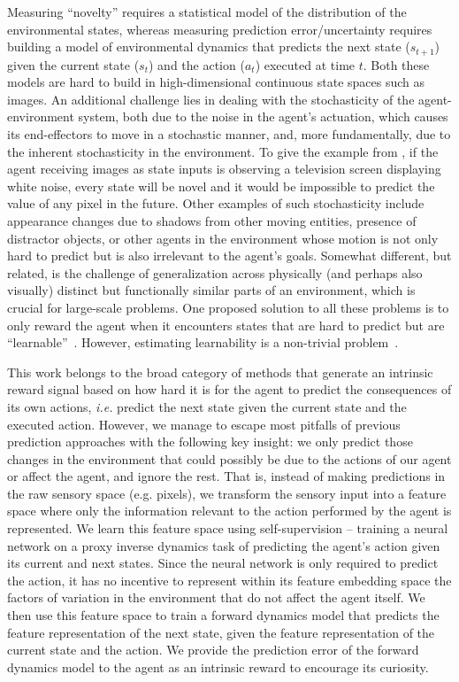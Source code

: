 \documentclass{article}
\begin{document}
Measuring ``novelty'' requires a statistical model of the distribution of the environmental states, whereas measuring prediction error/uncertainty requires building a model of environmental dynamics that predicts the next state ($s_{t+1}$) given the current state ($s_{t}$) and the action ($a_{t}$) executed at time $t$. Both these models are hard to build in high-dimensional continuous state spaces such as images. An additional challenge lies in dealing with the stochasticity of the agent-environment system, both due to the noise in the agent's actuation, which causes its end-effectors to move in a stochastic manner, and, more fundamentally, due to the inherent stochasticity in the environment. To give the example from \cite{schmidhuber2010formal}, if the agent receiving images as state inputs is observing a television screen displaying white noise, every state will be novel and it would be impossible to predict the value of any pixel in the future. Other examples of such stochasticity include appearance changes due to shadows from other moving entities, presence of distractor objects, or other agents in the environment whose motion is not only hard to predict but is also irrelevant to the agent's goals. Somewhat different, but related, is the challenge of generalization across physically (and perhaps also visually) distinct but functionally similar parts of an environment, which is crucial for large-scale problems.
One proposed solution to all these problems is to only reward the agent when it encounters states that are hard to predict but are ``learnable''~\cite{schmidhuber1991possibility}. However, estimating learnability is a non-trivial problem~\cite{lopes2012exploration}.

This work belongs to the broad category of methods that generate an intrinsic reward signal based on how hard it is for the agent to predict the consequences of its own actions, {\em i.e.} predict the next state given the current state and the executed action. However, we manage to escape most pitfalls of previous prediction approaches with the following key insight: we only predict those changes in the environment that could possibly be due to the actions of our agent or affect the agent, and ignore the rest. That is, instead of making predictions in the raw sensory space (e.g. pixels), we transform the sensory input into a feature space where only the information relevant to the action performed by the agent is represented. We learn this feature space using self-supervision -- training a neural network on a proxy inverse dynamics task of predicting the agent's action given its current and next states. Since the neural network is only required to predict the action, it has no incentive to represent within its feature embedding space the factors of variation in the environment that do not affect the agent itself. We then use this feature space to train a forward dynamics model that predicts the feature representation of the next state, given the feature representation of the current state and the action. We provide the prediction error of the forward dynamics model to the agent as an intrinsic reward to encourage its curiosity.
\end{document}
